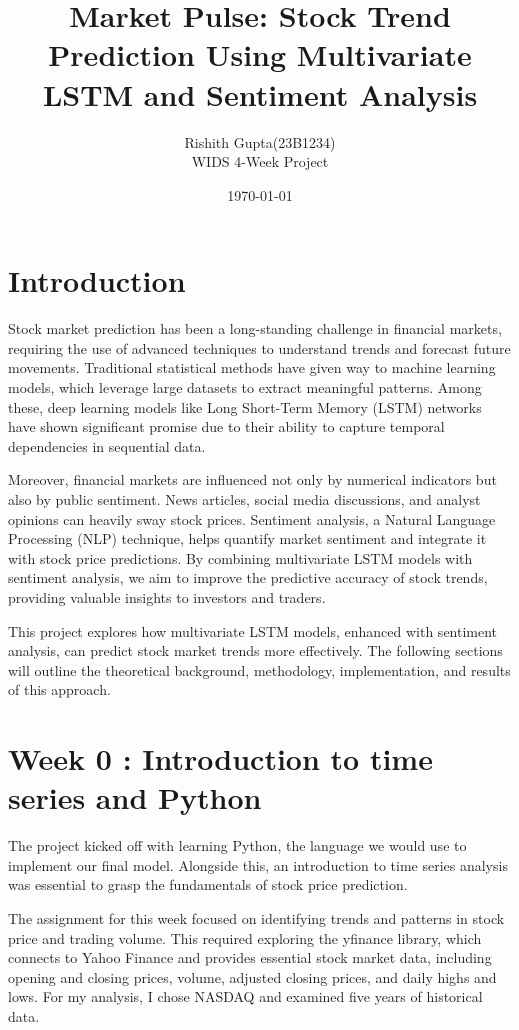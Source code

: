 \documentclass[12pt,a4paper]{article}
\title{\textbf{Market Pulse: Stock Trend Prediction Using Multivariate LSTM and Sentiment Analysis}}
\author{Rishith Gupta(23B1234) \\ WIDS 4-Week Project}
\date{\today}
\begin{document}
\maketitle
\newpage

\tableofcontents
\newpage

\section{Introduction}
Stock market prediction has been a long-standing challenge in financial markets, requiring the use of advanced techniques to understand trends and forecast future movements. Traditional statistical methods have given way to machine learning models, which leverage large datasets to extract meaningful patterns. Among these, deep learning models like Long Short-Term Memory (LSTM) networks have shown significant promise due to their ability to capture temporal dependencies in sequential data.

Moreover, financial markets are influenced not only by numerical indicators but also by public sentiment. News articles, social media discussions, and analyst opinions can heavily sway stock prices. Sentiment analysis, a Natural Language Processing (NLP) technique, helps quantify market sentiment and integrate it with stock price predictions. By combining multivariate LSTM models with sentiment analysis, we aim to improve the predictive accuracy of stock trends, providing valuable insights to investors and traders.

This project explores how multivariate LSTM models, enhanced with sentiment analysis, can predict stock market trends more effectively. The following sections will outline the theoretical background, methodology, implementation, and results of this approach.

\section{Week 0 : Introduction to time series and Python}
The project kicked off with learning Python, the language we would use to implement our final model. Alongside this, an introduction to time series analysis was essential to grasp the fundamentals of stock price prediction.

The assignment for this week focused on identifying trends and patterns in stock price and trading volume. This required exploring the yfinance library, which connects to Yahoo Finance and provides essential stock market data, including opening and closing prices, volume, adjusted closing prices, and daily highs and lows. For my analysis, I chose NASDAQ and examined five years of historical data.
\end{document}
